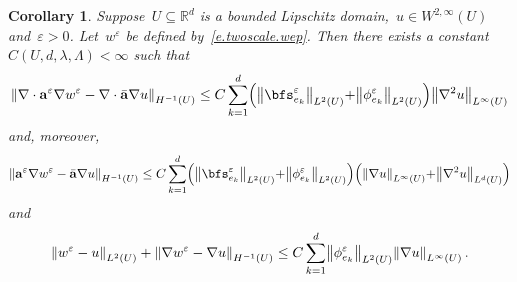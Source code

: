 \documentclass[11pt,twoside]{article} %
\numberwithin{equation}{section}
\newtheorem{corollary}[theorem]{Corollary}
\theoremstyle{definition}
\let\originalleft\left
\let\originalright\right
\renewcommand{\left}{\mathopen{}\mathclose\bgroup\originalleft}
\renewcommand{\right}{\aftergroup\egroup\originalright}
\newcommand*{\Rd}{\ensuremath{\mathbb{R}^d}}
\newcommand{\eps}{\varepsilon}
\newcommand{\ep}{\eps}
\renewcommand{\a}{\mathbf{a}}
\newcommand{\ahom}{\bar{\a}}
\begin{document}
\begin{corollary} \label{c.twoscale}
Suppose~$U\subseteq\Rd$ is a bounded Lipschitz domain,~$u\in W^{2,\infty}(U)$ and~$\ep >0$. Let~$w^\ep$ be defined by~\eqref{e.twoscale.wep}. 
Then there exists a constant~$C(U,d,\lambda,\Lambda)<\infty$ such that
\begin{align}
\label{e.twoscale.explicit}
\left\|
\nabla \cdot \a^\ep \nabla w^\ep 
-
\nabla\cdot \ahom \nabla u
\right\|_{H^{-1}(U)}  
\leq
C 
\sum_{k=1}^d 
\left( \left\| \bfs_{e_k}^\ep  \right\|_{L^2(U)} {+} \left\| \phi_{e_k}^\ep  \right\|_{L^2(U)}   \right)
\left\| \nabla^2 u \right\|_{L^{\infty}(U)}
\end{align}
and, moreover,  
\begin{align} \label{e.twoscale.explicit2}
\left\| 
\a^\ep \nabla w^\ep - \ahom \nabla u \right\|_{H^{-1}(U)} 
\leq 
C \sum_{k=1}^d 
\left( \left\| \bfs_{e_k}^\ep  \right\|_{L^2(U)} {+} \left\| \phi_{e_k}^\ep  \right\|_{L^2(U)}   \right) 
\left(\left\| \nabla u \right\|_{L^{\infty}(U)}  {+} \left\| \nabla^2 u \right\|_{L^{d}(U)} \right)
\end{align}
and 
\begin{align}
\label{e.twoscale.strip}
\left\| 
w^\ep - u 
\right\|_{L^2(U)} 
+
\left\| 
\nabla w^\ep - \nabla u \right\|_{H^{-1}(U)} 
\leq
C  \sum_{k=1}^d 
\left\| \phi_{e_k}^\ep  \right\|_{L^2(U)} 
\left\| \nabla u \right\|_{L^\infty(U)} \,.
\end{align}
\end{corollary}
\end{document}

